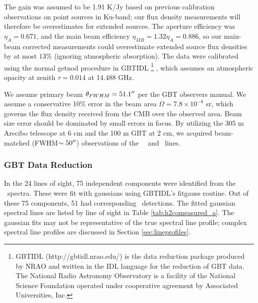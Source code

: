 The gain was assumed to be 1.91 K/Jy based on previous calibration observations
on point sources in Ku-band; our flux density measurements will therefore be
overestimates for extended sources.  The aperture efficiency was
$\eta_{A}=0.671$, and the main beam efficiency $\eta_{MB}=1.32\eta_{A}=0.886$,
so our main-beam corrected measurements could overestimate extended source flux
densities by at most $13\%$ (ignoring atmospheric absorption).
The data were calibrated using the normal {\sc getnod} procedure in GBTIDL 
\footnote{ GBTIDL (http://gbtidl.nrao.edu/) is the data reduction package
produced by NRAO and written in the IDL language for the reduction of GBT data.
The National Radio Astronomy Observatory is a facility of the National Science
Foundation operated under cooperative agreement by Associated Universities,
Inc.
} ,
which assumes an atmospheric opacity at zenith $\tau=0.014$ at 14.488 GHz. 

We assume primary beam $\theta_{FWHM}=51.1\mbox{$^{\prime\prime}$}$ %
per the GBT
observers manual.  We assume a conservative 10\% error in the beam area
$\Omega=7.8\times10^{-8}$ sr, which governs the flux density received from the
CMB over the observed area.  Beam size error should be dominated by small errors
in focus.  By utilizing the 305 m Arecibo telescope at 6 cm and the 100 m GBT
at 2 cm, we acquired beam-matched (FWHM$\sim 50\mbox{$^{\prime\prime}$}$) observations of the
\formaldehyde\ \oneone\ and \twotwo\ lines.  




\subsubsection{GBT Data Reduction}
In the 24 lines of sight, 75 independent components were identified from the
\oneone\ spectra.  These were fit with gaussians using GBTIDL's {\sc fitgauss}
routine.  Out of these 75 components, 51 had corresponding \twotwo\ detections.
The fitted gaussian spectral lines are listed by line of sight in Table
\ref{tab:h2comeasured_a}.  The gaussian fits may not be representative of the
true spectral line profile; complex spectral line profiles are discussed in Section
\ref{sec:lineprofiles}.

